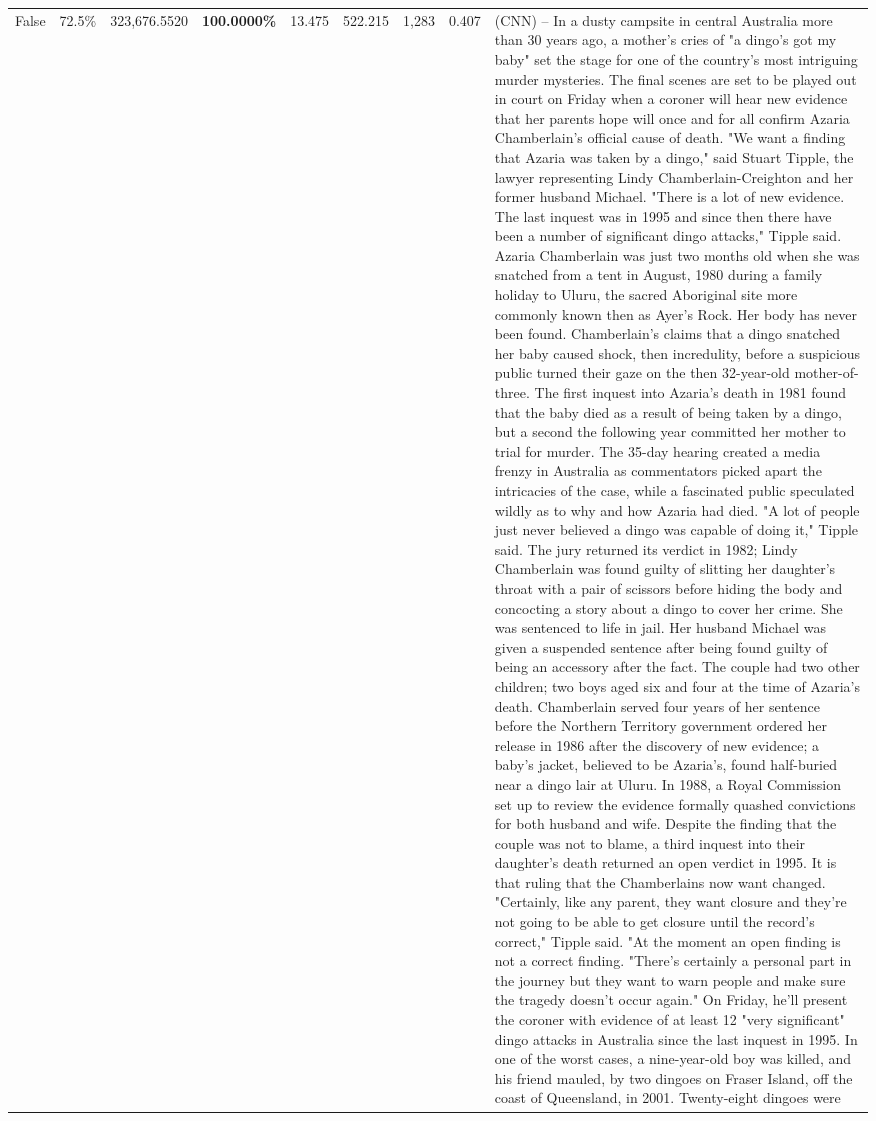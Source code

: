 \begin{table}[H]
\begin{tabular}{lllrlllll}
False & 72.5\% & 323,676.5520 & \bfseries \color{red} 100.0000\% & 13.475 & 522.215 & 1,283 & 0.407 & (CNN) -- In a dusty campsite in central Australia more than 30 years ago, a mother's cries of "a dingo's got my baby" set the stage for one of the country's most intriguing murder mysteries. The final scenes are set to be played out in court on Friday when a coroner will hear new evidence that her parents hope will once and for all confirm Azaria Chamberlain's official cause of death. "We want a finding that Azaria was taken by a dingo," said Stuart Tipple, the lawyer representing Lindy Chamberlain-Creighton and her former husband Michael. "There is a lot of new evidence. The last inquest was in 1995 and since then there have been a number of significant dingo attacks," Tipple said. Azaria Chamberlain was just two months old when she was snatched from a tent in August, 1980 during a family holiday to Uluru, the sacred Aboriginal site more commonly known then as Ayer's Rock. Her body has never been found. Chamberlain's claims that a dingo snatched her baby caused shock, then incredulity, before a suspicious public turned their gaze on the then 32-year-old mother-of-three. The first inquest into Azaria's death in 1981 found that the baby died as a result of being taken by a dingo, but a second the following year committed her mother to trial for murder. The 35-day hearing created a media frenzy in Australia as commentators picked apart the intricacies of the case, while a fascinated public speculated wildly as to why and how Azaria had died. "A lot of people just never believed a dingo was capable of doing it," Tipple said. The jury returned its verdict in 1982; Lindy Chamberlain was found guilty of slitting her daughter's throat with a pair of scissors before hiding the body and concocting a story about a dingo to cover her crime. She was sentenced to life in jail. Her husband Michael was given a suspended sentence after being found guilty of being an accessory after the fact. The couple had two other children; two boys aged six and four at the time of Azaria's death. Chamberlain served four years of her sentence before the Northern Territory government ordered her release in 1986 after the discovery of new evidence; a baby's jacket, believed to be Azaria's, found half-buried near a dingo lair at Uluru. In 1988, a Royal Commission set up to review the evidence formally quashed convictions for both husband and wife. Despite the finding that the couple was not to blame, a third inquest into their daughter's death returned an open verdict in 1995. It is that ruling that the Chamberlains now want changed. "Certainly, like any parent, they want closure and they're not going to be able to get closure until the record's correct," Tipple said. "At the moment an open finding is not a correct finding. "There's certainly a personal part in the journey but they want to warn people and make sure the tragedy doesn't occur again." On Friday, he'll present the coroner with evidence of at least 12 "very significant" dingo attacks in Australia since the last inquest in 1995. In one of the worst cases, a nine-year-old boy was killed, and his friend mauled, by two dingoes on Fraser Island, off the coast of Queensland, in 2001. Twenty-eight dingoes were 
\end{tabular}
\end{table}
